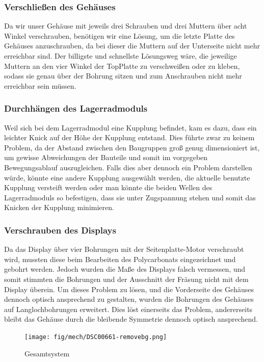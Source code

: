 \subsubsection{Verschließen des Gehäuses}
Da wir unser Gehäuse mit jeweils drei Schrauben und drei Muttern über acht Winkel verschrauben, benötigen
wir eine Lösung, um die letzte Platte des Gehäuses anzuschrauben, da bei dieser die Muttern auf der Unterseite nicht mehr erreichbar sind.
Der billigste und schnellste Lösungsweg wäre,
die jeweilige Muttern an den vier Winkel der TopPlatte zu verschweißen oder zu kleben, sodass sie genau über der
Bohrung sitzen und zum Anschrauben nicht mehr erreichbar sein müssen.

\subsubsection{Durchhängen des Lagerradmoduls}
Weil sich bei dem Lagerradmodul eine Kupplung befindet, kam es dazu, dass ein leichter Knick
auf der Höhe der Kupplung entstand.
Dies führte zwar zu keinem Problem, da der Abstand zwischen den Baugruppen groß genug dimensioniert ist, um gewisse Abweichungen der Bauteile und somit im
vorgegeben Bewegungsablauf auszugleichen.
Falls dies aber dennoch ein Problem darstellen würde, könnte eine andere Kupplung ausgewählt werden, die aktuelle benutzte Kupplung versteift werden oder
man könnte die beiden Wellen des Lagerradmoduls so befestigen, dass sie unter
Zugspannung stehen und somit das Knicken der Kupplung minimieren.

\subsubsection{Verschrauben des Displays}
Da das Display über vier Bohrungen mit der Seitenplatte-Motor verschraubt wird, mussten diese
beim Bearbeiten des Polycarbonats eingezeichnet und gebohrt werden.
Jedoch wurden die Maße des Displays falsch vermessen, und somit stimmten die Bohrungen und der Ausschnitt
der Fräsung nicht mit dem Display überein.
Um dieses Problem zu lösen, und die Vorderseite des Gehäuses dennoch optisch ansprechend zu gestalten, wurden die Bohrungen
des Gehäuses auf Langlochbohrungen erweitert.
Dies löst einerseits das Problem, andererseits
bleibt das Gehäuse durch die bleibende Symmetrie dennoch optisch ansprechend.

\begin{figure}[H]
    \centering
    \texttt{[image: fig/mech/DSC00661-removebg.png]}
    \caption{Gesamtsystem}
    \label{fig:GesamtsystemEcht}
\end{figure}

